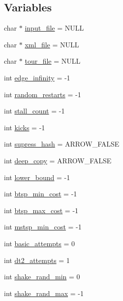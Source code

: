 \subsection*{Variables}
\begin{CompactItemize}
\item 
char $\ast$ \hyperlink{bin_2baltsp-dt2_8c_a4f3a15de34c409bdec6ceacf93078ed}{input\_\-file} = NULL
\item 
char $\ast$ \hyperlink{bin_2baltsp-dt2_8c_bf4e392494984c6ef8259268eb1fe421}{xml\_\-file} = NULL
\item 
char $\ast$ \hyperlink{bin_2baltsp-dt2_8c_b818a82f867be75d7c4d92d792b0943e}{tour\_\-file} = NULL
\item 
int \hyperlink{bin_2baltsp-dt2_8c_61a12d5995172f376610cce2f19e5855}{edge\_\-infinity} = -1
\item 
int \hyperlink{bin_2baltsp-dt2_8c_e6a9db0fe5c8a0407d62dec2f7a14959}{random\_\-restarts} = -1
\item 
int \hyperlink{bin_2baltsp-dt2_8c_a1641a28cf3ea572a56763e84518c17b}{stall\_\-count} = -1
\item 
int \hyperlink{bin_2baltsp-dt2_8c_b8f057ba1ad6b7f0c46f8140b25b3467}{kicks} = -1
\item 
int \hyperlink{bin_2baltsp-dt2_8c_c022145e682345ed4064bad274e5a4f1}{supress\_\-hash} = ARROW\_\-FALSE
\item 
int \hyperlink{bin_2baltsp-dt2_8c_7298da576a5b127d04b4c46b3bc78821}{deep\_\-copy} = ARROW\_\-FALSE
\item 
int \hyperlink{bin_2baltsp-dt2_8c_ed7394fd8e0c2796b26b9654fd10fd9d}{lower\_\-bound} = -1
\item 
int \hyperlink{bin_2baltsp-dt2_8c_97987334c96a847ff74c2c6c83d78a73}{btsp\_\-min\_\-cost} = -1
\item 
int \hyperlink{bin_2baltsp-dt2_8c_8135b6557d64f65441d8f07fdc21ffdc}{btsp\_\-max\_\-cost} = -1
\item 
int \hyperlink{bin_2baltsp-dt2_8c_79e1b33b7d744b8baacfe9c0b2e73013}{mstsp\_\-min\_\-cost} = -1
\item 
int \hyperlink{bin_2baltsp-dt2_8c_227b7ec968925f365b96a92ace419c56}{basic\_\-attempts} = 0
\item 
int \hyperlink{bin_2baltsp-dt2_8c_d4c3a6197eb631f711a3baf6af37e85c}{dt2\_\-attempts} = 1
\item 
int \hyperlink{bin_2baltsp-dt2_8c_b7fc57ece1162e77f74b4803961b72cb}{shake\_\-rand\_\-min} = 0
\item 
int \hyperlink{bin_2baltsp-dt2_8c_bcacd5fab89a9f3eaab5401c5001b4c5}{shake\_\-rand\_\-max} = -1

\end{CompactItemize}

